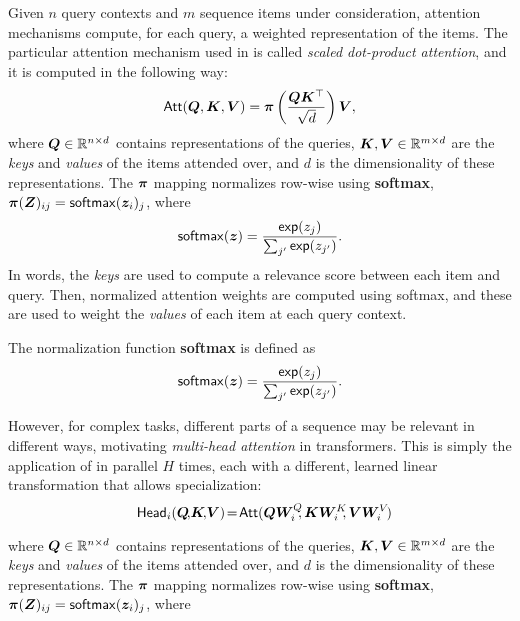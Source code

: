 Given $n$ query contexts and $m$ sequence items under consideration,
attention mechanisms compute, for each query, a weighted
representation of the items. The particular attention mechanism used
in \citet{vaswani2017attention} is called \emph{scaled dot-product
  attention}, and it is computed in the following way:
%
\begin{equation}
  \operatorname{\mathsf{Att}}(\bm{Q}, \bm{K}, \bm{V}) = \bm{\pi}
  \left(\frac{\bm{Q}\bm{K}^\top}{\sqrt{d}}\right) \bm{V},
  \label{eq:att_scaled_dot}
\end{equation}
%
where $\bm{Q} \in \mathbb{R}^{n \times d}$ contains representations of the
queries, $\bm{K}, \bm{V} \in \mathbb{R}^{m \times d}$
are the \emph{keys} and \emph{values} of the items attended over,
and $d$ is the dimensionality of these
representations.
The $\bm{\pi}$ mapping normalizes row-wise using \textbf{softmax},
$\bm{\pi}(\bm{Z})_{ij} = \operatorname*{\mathsf{softmax}}(\bm{z}_i)_j$, where
%
\begin{equation}
  \operatorname*{\mathsf{softmax}}(\bm{z}) = \frac{\operatorname*{\mathsf{exp}}(z_j)}{\sum_{j'} \operatorname*{\mathsf{exp}}(z_{j'})}.
\end{equation}
%
In words, the \emph{keys} are used to compute a relevance score
between each item and query. Then, normalized attention weights are computed
using softmax, and these are used to weight the \emph{values} of each item at each
query context.

\begin{definition}
  The normalization function \textbf{softmax} is defined as
  \begin{equation}\label{eq:softmax}
    \operatorname*{\mathsf{softmax}}(\bm{z}) = \frac{\operatorname*{\mathsf{exp}}(z_j)}{\sum_{j'} \operatorname*{\mathsf{exp}}(z_{j'})}.
  \end{equation}
\end{definition}

However, for complex tasks, different parts of a sequence may be relevant in
different ways, motivating \emph{multi-head attention} in transformers.
This is simply the application of
 in parallel $H$ times, each with a different,
learned linear transformation that allows specialization:
%
\begin{equation}\label{eq:head}%
  \hspace{-.01ex}%
  \ath_i(\bm{Q}\!,\!\bm{K}\!,\!\bm{V})\!=\!\att(\bm{QW}_i^Q\!\!,\bm{KW}_i^K\!\!,\bm{VW}_i^V\!)%
  \hspace{-1.5ex}%
\end{equation}

\noindent where $\bm{Q} \in \mathbb{R}^{n \times d}$ contains
representations of the queries, $\bm{K}, \bm{V} \in \mathbb{R}^{m \times
    d}$ are the \emph{keys} and \emph{values} of the items attended over,
and $d$ is the dimensionality of these representations. The $\bm{\pi}$
mapping normalizes row-wise using \textbf{softmax},
$\bm{\pi}(\bm{Z})_{ij} = \operatorname*{\mathsf{softmax}}(\bm{z}_i)_j$, where


